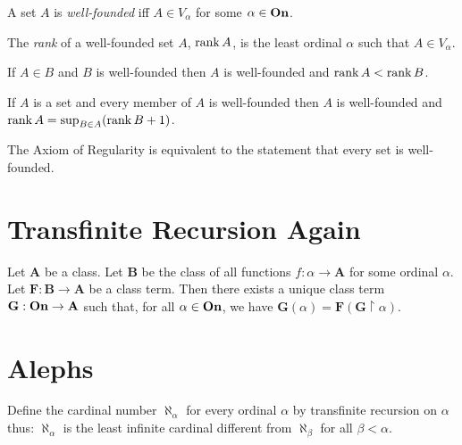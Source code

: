 \begin{definition}
    A set $A$ is \emph{well-founded} iff $A \in V_\alpha$ for some $\alpha \in \mathbf{On}$.
\end{definition}

\begin{definition}[Rank]
    The \emph{rank} of a well-founded set $A$, $\operatorname{rank} A$, is the least
    ordinal $\alpha$ such that $A \in V_\alpha$.    
\end{definition}

\begin{theorem}
    If $A \in B$ and $B$ is well-founded then $A$ is well-founded
    and $\operatorname{rank} A < \operatorname{rank} B$.
\end{theorem}

\begin{theorem}
    If $A$ is a set and every member of $A$ is well-founded then $A$ is well-founded
    and $\operatorname{rank} A = \sup_{B \in A} (\operatorname{rank} B + 1)$.
\end{theorem}

\begin{theorem}
    The Axiom of Regularity is equivalent to the statement that every set is well-founded.
\end{theorem}

\section{Transfinite Recursion Again}

\begin{theorem}
    Let $\mathbf{A}$ be a class. Let $\mathbf{B}$
    be the class of all functions $f : \alpha \rightarrow \mathbf{A}$
    for some ordinal $\alpha$. Let $\mathbf{F}
    : \mathbf{B} \rightarrow \mathbf{A}$ be a class term.
    Then there exists a unique class term $\mathbf{G} : \mathbf{On}
    \rightarrow \mathbf{A}$ such that, for all $\alpha \in \mathbf{On}$,
    we have $\mathbf{G}(\alpha) = \mathbf{F}(\mathbf{G} \restriction \alpha)$.
\end{theorem}

\section{Alephs}

\begin{definition}
    Define the cardinal number $\aleph_\alpha$ for every ordinal
    $\alpha$ by transfinite recursion on $\alpha$ thus:
    $\aleph_\alpha$ is the least infinite cardinal different from
    $\aleph_\beta$ for all $\beta < \alpha$.
\end{definition}

